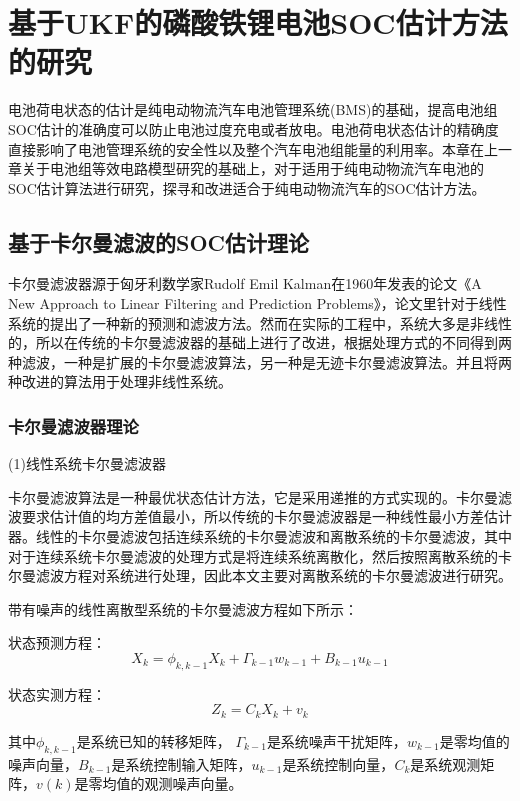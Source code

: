 
\chapter{基于UKF的磷酸铁锂电池SOC估计方法的研究}
电池荷电状态的估计是纯电动物流汽车电池管理系统(BMS)的基础，提高电池组SOC估计的准确度可以防止电池过度充电或者放电。电池荷电状态估计的精确度直接影响了电池管理系统的安全性以及整个汽车电池组能量的利用率。本章在上一章关于电池组等效电路模型研究的基础上，对于适用于纯电动物流汽车电池的SOC估计算法进行研究，探寻和改进适合于纯电动物流汽车的SOC估计方法。

\section{基于卡尔曼滤波的SOC估计理论}
卡尔曼滤波器源于匈牙利数学家Rudolf Emil Kalman在1960年发表的论文《A New Approach to Linear Filtering and Prediction Problems》，论文里针对于线性系统的提出了一种新的预测和滤波方法。然而在实际的工程中，系统大多是非线性的，所以在传统的卡尔曼滤波器的基础上进行了改进，根据处理方式的不同得到两种滤波，一种是扩展的卡尔曼滤波算法，另一种是无迹卡尔曼滤波算法。并且将两种改进的算法用于处理非线性系统。
\subsection{卡尔曼滤波器理论}

(1)线性系统卡尔曼滤波器

卡尔曼滤波算法是一种最优状态估计方法，它是采用递推的方式实现的。卡尔曼滤波要求估计值的均方差值最小，所以传统的卡尔曼滤波器是一种线性最小方差估计器。线性的卡尔曼滤波包括连续系统的卡尔曼滤波和离散系统的卡尔曼滤波，其中对于连续系统卡尔曼滤波的处理方式是将连续系统离散化，然后按照离散系统的卡尔曼滤波方程对系统进行处理，因此本文主要对离散系统的卡尔曼滤波进行研究。

带有噪声的线性离散型系统的卡尔曼滤波方程如下所示：

状态预测方程：
\begin{equation}
{{X}_{k}}={{\phi }_{k,k-1}}{{X}_{k}}+{{\Gamma }_{k-1}}{{w}_{k-1}}+{{B}_{k-1}}{{u}_{k-1}}
\end{equation}

状态实测方程：
\begin{equation}
{{Z}_{k}}={{C}_{k}}{{X}_{k}}+{{v}_{k}}
\end{equation}

其中${{\phi }_{k,k-1}}$是系统已知的转移矩阵， ${{\Gamma }_{k-1}}$是系统噪声干扰矩阵，${{w}_{k-1}}$是零均值的噪声向量，${{B}_{k-1}}$是系统控制输入矩阵，${{u}_{k-1}}$是系统控制向量，${{C}_{k}}$是系统观测矩阵，$v(k)$是零均值的观测噪声向量。

